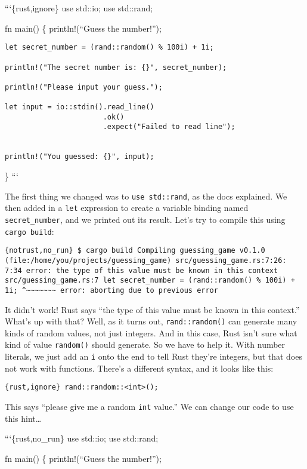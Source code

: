 \documentclass[]{article}
\begin{document}
```\{rust,ignore\} use std::io; use std::rand;

fn main() \{ println!(``Guess the number!'');

\begin{verbatim}
let secret_number = (rand::random() % 100i) + 1i;

println!("The secret number is: {}", secret_number);

println!("Please input your guess.");

let input = io::stdin().read_line()
                       .ok()
                       .expect("Failed to read line");


println!("You guessed: {}", input);
\end{verbatim}

\} ```

The first thing we changed was to \texttt{use std::rand}, as the docs
explained. We then added in a \texttt{let} expression to create a
variable binding named \texttt{secret\_number}, and we printed out its
result. Let's try to compile this using \texttt{cargo build}:

\texttt{\{notrust,no\_run\} \$ cargo build    Compiling guessing\_game v0.1.0 (file:/home/you/projects/guessing\_game) src/guessing\_game.rs:7:26: 7:34 error: the type of this value must be known in this context src/guessing\_game.rs:7     let secret\_number = (rand::random() \% 100i) + 1i;                                                 \^{}\textasciitilde{}\textasciitilde{}\textasciitilde{}\textasciitilde{}\textasciitilde{}\textasciitilde{}\textasciitilde{} error: aborting due to previous error}

It didn't work! Rust says ``the type of this value must be known in this
context.'' What's up with that? Well, as it turns out,
\texttt{rand::random()} can generate many kinds of random values, not
just integers. And in this case, Rust isn't sure what kind of value
\texttt{random()} should generate. So we have to help it. With number
literals, we just add an \texttt{i} onto the end to tell Rust they're
integers, but that does not work with functions. There's a different
syntax, and it looks like this:

\texttt{\{rust,ignore\} rand::random::\textless{}int\textgreater{}();}

This says ``please give me a random \texttt{int} value.'' We can change
our code to use this hint\ldots{}

```\{rust,no\_run\} use std::io; use std::rand;

fn main() \{ println!(``Guess the number!'');
\end{document}
